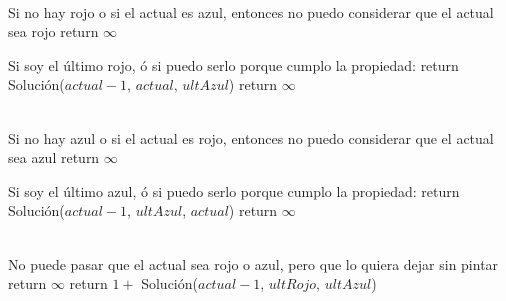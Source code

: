 \begin{algorithm}[H]
\begin{algorithmic}
 \\ 
    \Comment Si no hay rojo o si el actual es azul, entonces no puedo considerar que el actual sea rojo
        \State return $\infty$
    
    \Else \Comment Si soy el último rojo, ó si puedo serlo porque cumplo la propiedad:
            \State return Solución($actual - 1$, $actual$, $ultAzul$)
        \Else 
            \State return $\infty$
        \EndIf 
    \EndIf
\EndProcedure
\end{algorithmic}
\end{algorithm}


\begin{algorithm}[H]
\begin{algorithmic}
 \\ 
    \Comment Si no hay azul o si el actual es rojo, entonces no puedo considerar que el actual sea azul
        \State return $\infty$
    
    \Else \Comment Si soy el último azul, ó si puedo serlo porque cumplo la propiedad:
            \State return Solución($actual - 1$, $ultAzul$, $actual$)
        \Else 
            \State return $\infty$
        \EndIf 
    \EndIf
\EndProcedure
\end{algorithmic}
\end{algorithm} 


\begin{algorithm}[H]
\begin{algorithmic}
 \\
    \Comment No puede pasar que el actual sea rojo o azul, pero que lo quiera dejar sin pintar
        \State return $\infty$
    \Else 
        \State return $1 + $  Solución($actual - 1$, $ultRojo$, $ultAzul$)
    \EndIf
\EndProcedure
\end{algorithmic}
\end{algorithm}


